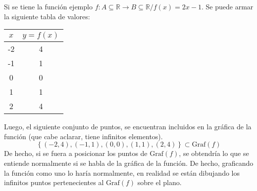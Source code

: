 \begin{example}
    Si se tiene la función ejemplo $f: A \subseteq \mathbb{R} \rightarrow B \subseteq \mathbb{R} / f(x)=2x-1$.
    Se puede armar la siguiente tabla de valores:
    \begin{table}[H]
        \centering
        \begin{tabular}{|c|c|}
            \hline
            $x$ & $y=f(x)$ \\ \hline
            -2  & 4        \\ \hline
            -1  & 1        \\ \hline
            0   & 0        \\ \hline
            1   & 1        \\ \hline
            2   & 4        \\ \hline
            \end{tabular}
      \end{table}
    Luego, el siguiente conjunto de puntos, se encuentran incluidos en la
    gráfica de la función (que cabe aclarar, tiene infinitos elementos).
    \begin{equation*}
        \left\{ (-2,4),(-1,1),(0,0),(1,1),(2,4) \right\}\subset \text{Graf}(f)
    \end{equation*}
    De hecho, si se fuera a posicionar los puntos de $\text{Graf}(f)$, se obtendría
    lo que se entiende normalmente si se habla de la gráfica de la función. De hecho,
    graficando la función como uno lo haría normalmente, en realidad
    se están dibujando los infinitos puntos pertenecientes
    al $\text{Graf}(f)$ sobre el plano.
    \begin{center}
        \end{center}
\end{example}
